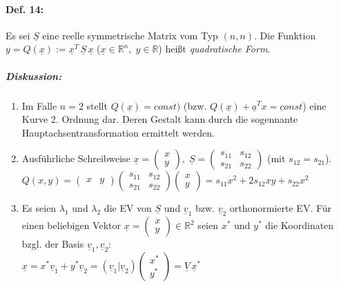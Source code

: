 \paragraph{Def. 14: }
Es sei $\underline{S}$ eine reelle symmetrische Matrix vom Typ $(n,n)$. Die Funktion $y=Q(\underline{x}):=\underline{x}^T\, \underline{S}\, \underline{x}$ ($\underline{x}\in \mathbb{R}^n,\; y \in \mathbb{R}$) heißt \emph{quadratische Form}.
\subparagraph{Diskussion:} 
\begin{enumerate}
\item Im Falle $n=2$ stellt $Q(\underline{x})=const)$ (bzw. $Q(\underline{x})+\underline{a}^T\underline{x=const}$) eine Kurve 2. Ordnung dar. Deren Gestalt kann durch die sogennante Hauptachsentransformation ermittelt werden.
\item Ausführliche Schreibweise $\underline{x}=\begin{pmatrix}
x\\
y
\end{pmatrix},\; \underline{S}=\begin{pmatrix}
s_{11} & s_{12}\\
s_{21} & s_{22}
\end{pmatrix}$ (mit $s_{12}=s_{21}$).\\
$\boxed{Q(x,y)=\begin{pmatrix}
x & y
\end{pmatrix} \begin{pmatrix}
s_{11} & s_{12}\\
s_{21} & s_{22}
\end{pmatrix} \begin{pmatrix}
x\\
y
\end{pmatrix}=s_{11}x^2+2s_{12}xy+s_{22}x^2}$
\item Es seien $\lambda_1$ und $\lambda_2$ die EV von $\underline{S}$ und $\underline{v}_1$ bzw. $\underline{v}_2$ orthonormierte EV. Für einen beliebigen Vektor $\underline{x}=\begin{pmatrix}
x\\
y
\end{pmatrix}\in \mathbb{R}^2$ seien $x^*$ und $y^*$ die Koordinaten bzgl. der Basis $\underline{v}_1, \underline{v}_2$:\\
$\boxed{\underline{x}=x^*\underline{v}_1+y^*\underline{v}_2 = (\underline{v}_1 | \underline{v}_2) \begin{pmatrix}
x^*\\
y^*
\end{pmatrix}=\underline{V}\,\underline{x}^*}$\\

\end{enumerate}
